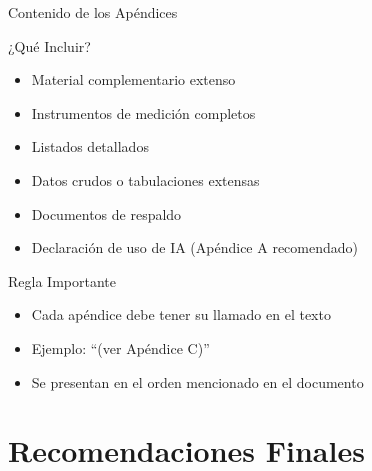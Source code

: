 \documentclass[spanish,aspectratio=169]{beamer}
\begin{document}
\begin{frame}{Contenido de los Apéndices}
	\begin{block}{¿Qué Incluir?}
		\begin{itemize}
			\item Material complementario extenso
			\item Instrumentos de medición completos
			\item Listados detallados
			\item Datos crudos o tabulaciones extensas
			\item Documentos de respaldo
			\item Declaración de uso de IA (Apéndice A recomendado)
		\end{itemize}
	\end{block}
	
	\begin{alertblock}{Regla Importante}
		\begin{itemize}
			\item Cada apéndice debe tener su llamado en el texto
			\item Ejemplo: ``(ver Apéndice C)''
			\item Se presentan en el orden mencionado en el documento
		\end{itemize}
	\end{alertblock}
\end{frame}

\section{Recomendaciones Finales}
\end{document}
